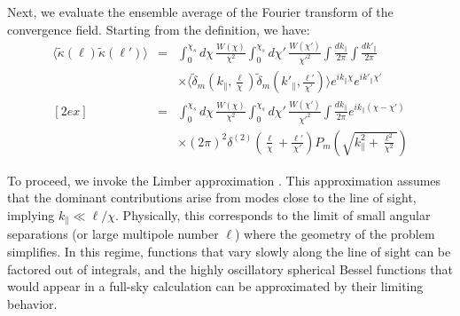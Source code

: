 Next, we evaluate the ensemble average of the Fourier transform of the convergence field. Starting from the definition, we have:
\begin{eqnarray}
    \langle \tilde{\kappa}(\boldsymbol{\ell}) \tilde{\kappa}(\boldsymbol{\ell}') \rangle 
    &=& \int_0^{\chi_s} d\chi \, \frac{W(\chi)}{\chi^2} \int_0^{\chi_s} d\chi' \, \frac{W(\chi')}{\chi'^2} 
        \int \frac{dk_\parallel}{2\pi} \int \frac{dk'_\parallel}{2\pi} \nonumber \\
    && \times \langle \tilde{\delta}_m\left(k_\parallel, \frac{\boldsymbol{\ell}}{\chi}\right) 
       \tilde{\delta}_m\left(k'_\parallel, \frac{\boldsymbol{\ell}'}{\chi'}\right) \rangle 
       e^{i k_\parallel \chi} e^{i k'_\parallel \chi'} \nonumber \\
    [2ex]
    &=& \int_0^{\chi_s} d\chi \, \frac{W(\chi)}{\chi^2} \int_0^{\chi_s} d\chi' \, \frac{W(\chi')}{\chi'^2} 
        \int \frac{dk_\parallel}{2\pi} e^{i k_\parallel (\chi - \chi')} \nonumber \\
    && \times (2\pi)^2 \delta^{(2)}\left(\frac{\boldsymbol{\ell}}{\chi} + \frac{\boldsymbol{\ell}'}{\chi'}\right) 
       P_m\left(\sqrt{k_\parallel^2 + \frac{\ell^2}{\chi^2}}\right) \nonumber 
    \label{eq:kappa_power_spectrum}
\end{eqnarray}

To proceed, we invoke the Limber approximation \citep{1954ApJ...119..655L}. This approximation assumes that the dominant contributions arise from modes close to the line of sight, implying \( k_\parallel \ll \ell/\chi \).
Physically, this corresponds to the limit of small angular separations (or large multipole number $\ell$) where the geometry of the problem simplifies. In this regime, functions that vary slowly along the line of sight can be factored out of integrals, and the highly oscillatory spherical Bessel functions that would appear in a full-sky calculation can be approximated by their limiting behavior. 

